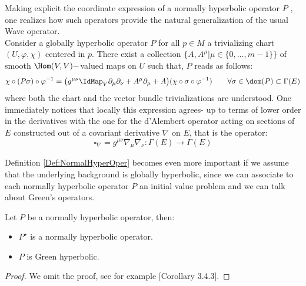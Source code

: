 \documentclass[Main]{subfiles}
\begin{document}
			Making explicit the coordinate expression of a normally hyperbolic operator $P$ , one realizes how such operators  provide the natural generalization of the usual Wave operator. 
			\\
			Consider a globally hyperbolic operator $P$ for all $p \in M$ a trivializing chart $(U, \varphi, \chi)$ centered in $p$. 
			There exist a collection $\big\{A, A^\mu \vert \mu\in \{0, \ldots ,m-1\}\big\}$ of smooth 
			$\Hom(V,V)-$valued maps on $U$ such that, $P$ reads as follows:
			\begin{equation}\label{Eq:NormallyHyperbolicRepresentation}
				\chi \circ ( P \sigma) \circ \varphi^{-1} =
				\big( g^{\mu \nu} \IdMap_V \partial_\mu \partial_\nu + A^\mu \partial_\mu + A\big)
				(\chi \circ \sigma \circ \varphi^{-1} ) 
				\qquad \forall \sigma \in \dom(P) \subset \Gamma(E)
			\end{equation}
		where both the chart and the vector bundle trivializations are understood. 
		One immediately notices that locally this expression agrees- up to terms of lower order in the derivatives with the one for the d'Alembert operator acting on sections of $E$  constructed out of a covariant derivative $\nabla$ on $E$, that is the operator:
		\begin{displaymath}
			\square_\nabla = g^{\mu \nu} \nabla_\mu \nabla_\nu : \Gamma(E) \rightarrow \Gamma(E)
		\end{displaymath}

		Definition \ref{Def:NormalHyperOper} becomes even more important if we assume that the underlying background is globally hyperbolic, since we can associate to each normally hyperbolic operator $P$ an initial value problem and we can talk about Green's operators.
		\begin{proposition}
			Let $P$ be a normally hyperbolic operator, then:
			\begin{itemize}
				\item	$P^\star$ is a normally hyperbolic operator.
				\item $P$ is Green hyperbolic.
			\end{itemize}
		\end{proposition}	
		\begin{proof}
			We omit the proof, see for example \cite{barwav}[Corollary 3.4.3].
		\end{proof}
		
\end{document}
